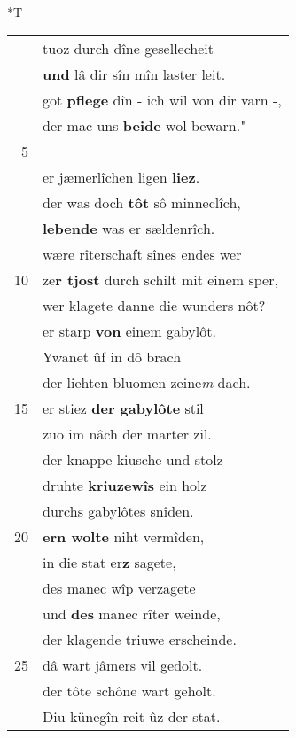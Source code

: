 \documentclass[8pt,a4paper,notitlepage]{article}
\begin{document}
\begin{table}[ht]
\begin{minipage}[t]{0.5\linewidth}
\end{minipage}
\hspace{0.5cm}
\begin{minipage}[t]{0.5\linewidth}
\small
\begin{center}*T
\end{center}
\begin{tabular}{rl}
 & tuoz durch dîne gesellecheit\\ 
 & \textbf{und} lâ dir sîn mîn laster leit.\\ 
 & got \textbf{pflege} dîn - ich wil von dir varn -,\\ 
 & der mac uns \textbf{beide} wol bewarn."\\ 
5 & \textit{\begin{large}I\end{large}}theren von Kaheviez\\ 
 & er jæmerlîchen ligen \textbf{liez}.\\ 
 & der was doch \textbf{tôt} sô minneclîch,\\ 
 & \textbf{lebende} was er sældenrîch.\\ 
 & wære rîterschaft sînes endes wer\\ 
10 & ze\textbf{r tjost} durch schilt mit einem sper,\\ 
 & wer klagete danne die wunders nôt?\\ 
 & er starp \textbf{von} einem gabylôt.\\ 
 & Ywanet ûf in dô brach\\ 
 & der liehten bluomen zeine\textit{m} dach.\\ 
15 & er stiez \textbf{der gabylôte} stil\\ 
 & zuo im nâch der marter zil.\\ 
 & der knappe kiusche und stolz\\ 
 & druhte \textbf{kriuzewîs} ein holz\\ 
 & durchs gabylôtes snîden.\\ 
20 & \textbf{ern wolte} niht vermîden,\\ 
 & in die stat er\textbf{z} sagete,\\ 
 & des manec wîp verzagete\\ 
 & und \textbf{des} manec rîter weinde,\\ 
 & der klagende triuwe erscheinde.\\ 
25 & dâ wart jâmers vil gedolt.\\ 
 & der tôte schône wart geholt.\\ 
 & Diu künegîn reit ûz der stat.\\ 

\end{tabular}
\end{minipage}
\end{table}
\end{document}
